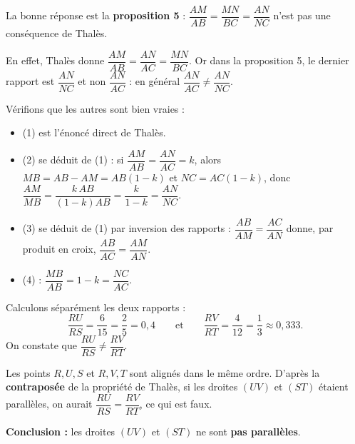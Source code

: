 \documentclass[11pt]{article}
\begin{document}
\begin{corrige}
La bonne réponse est la \textbf{proposition 5} : $\dfrac{AM}{AB} = \dfrac{MN}{BC} = \dfrac{AN}{NC}$ n'est pas une conséquence de Thalès.

En effet, Thalès donne $\dfrac{AM}{AB} = \dfrac{AN}{AC} = \dfrac{MN}{BC}$. Or dans la proposition 5, le dernier rapport est $\dfrac{AN}{NC}$ et non $\dfrac{AN}{AC}$ : en général $\dfrac{AN}{AC} \neq \dfrac{AN}{NC}$.

Vérifions que les autres sont bien vraies :
\begin{itemize}
    \item (1) est l'énoncé direct de Thalès.
    \item (2) se déduit de (1) : si $\dfrac{AM}{AB} = \dfrac{AN}{AC} = k$, alors $MB = AB - AM = AB(1-k)$ et $NC = AC(1-k)$, donc $\dfrac{AM}{MB} = \dfrac{k\,AB}{(1-k)AB} = \dfrac{k}{1-k} = \dfrac{AN}{NC}$.
    \item (3) se déduit de (1) par inversion des rapports : $\dfrac{AB}{AM} = \dfrac{AC}{AN}$ donne, par produit en croix, $\dfrac{AB}{AC} = \dfrac{AM}{AN}$.
    \item (4) : $\dfrac{MB}{AB} = 1 - k = \dfrac{NC}{AC}$.
\end{itemize}
\end{corrige}

\begin{corrige}
Calculons séparément les deux rapports :
\[ \dfrac{RU}{RS} = \dfrac{6}{15} = \dfrac{2}{5} = 0,4 \qquad \text{et} \qquad \dfrac{RV}{RT} = \dfrac{4}{12} = \dfrac{1}{3} \approx 0,333. \]
On constate que $\dfrac{RU}{RS} \neq \dfrac{RV}{RT}$.

Les points $R, U, S$ et $R, V, T$ sont alignés dans le même ordre. D'après la \textbf{contraposée} de la propriété de Thalès, si les droites $(UV)$ et $(ST)$ étaient parallèles, on aurait $\dfrac{RU}{RS} = \dfrac{RV}{RT}$, ce qui est faux.

\textbf{Conclusion :} les droites $(UV)$ et $(ST)$ ne sont \textbf{pas parallèles}.
\end{corrige}
\end{document}
